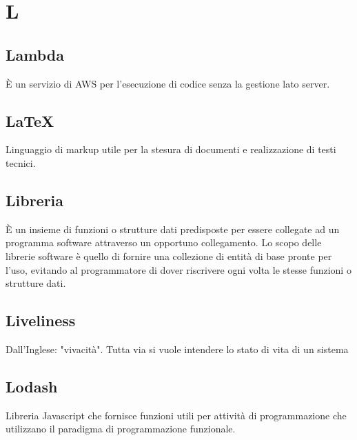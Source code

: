 \section*{L}

\subsection{Lambda}
È un servizio di AWS per l'esecuzione di codice senza la gestione lato server.

\subsection{LaTeX}
Linguaggio di markup utile per la stesura di documenti e realizzazione di testi tecnici. 

\subsection{Libreria}
È un insieme di funzioni o strutture dati predisposte per essere collegate ad un programma software attraverso un opportuno collegamento.
Lo scopo delle librerie software è quello di fornire una collezione di entità di base pronte per l'uso, evitando al programmatore di dover riscrivere ogni volta le stesse funzioni o strutture dati.

\subsection{Liveliness}
Dall'Inglese: "vivacità". Tutta via si vuole intendere lo stato di vita di un sistema

\subsection{Lodash}
Libreria Javascript che fornisce funzioni utili per attività di programmazione che utilizzano il paradigma di programmazione funzionale.